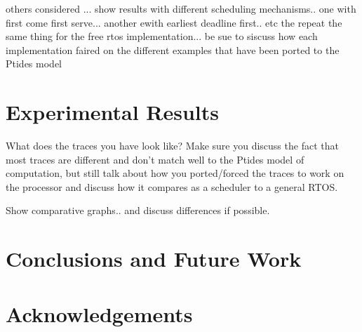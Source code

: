 \documentclass{sig-alternate}
\begin{document}
others considered ... show results with different scheduling mechanisms.. one with first come first serve... another ewith earliest deadline first.. etc
the repeat the same thing for the free rtos implementation...
be sue to siscuss how each implementation faired on the different examples that have been ported to the Ptides model

\section{Experimental Results}
What does the traces you have look like? Make sure you discuss the fact that most traces are different and don't match well to the Ptides model of computation, but still talk about how you ported/forced the traces to work on the processor and discuss how it compares as a scheduler to a general RTOS.

Show comparative graphs.. and discuss differences if possible.



\section{Conclusions and Future Work}
\label{scfw}
\section{Acknowledgements}

 


 
\end{document}
